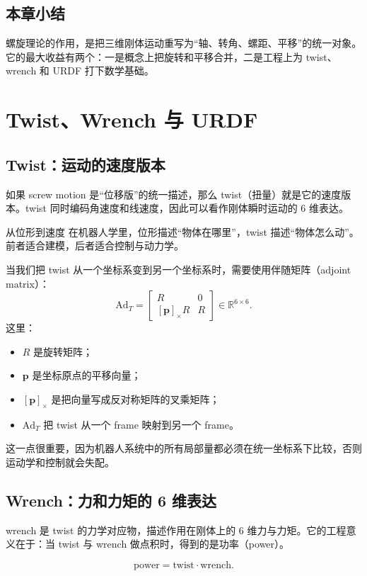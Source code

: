 \documentclass[a4paper]{article}
\begin{document}
\subsection{本章小结}
螺旋理论的作用，是把三维刚体运动重写为“轴、转角、螺距、平移”的统一对象。它的最大收益有两个：一是概念上把旋转和平移合并，二是工程上为 twist、wrench 和 URDF 打下数学基础。

\section{Twist、Wrench 与 URDF}

\subsection{Twist：运动的速度版本}
如果 screw motion 是“位移版”的统一描述，那么 twist（扭量）就是它的速度版本。twist 同时编码角速度和线速度，因此可以看作刚体瞬时运动的 6 维表达。

\begin{importantbox}{从位形到速度}
在机器人学里，位形描述“物体在哪里”，twist 描述“物体怎么动”。前者适合建模，后者适合控制与动力学。
\end{importantbox}

当我们把 twist 从一个坐标系变到另一个坐标系时，需要使用伴随矩阵（adjoint matrix）：
\[
\mathrm{Ad}_T =
\begin{bmatrix}
R & 0 \\
[\mathbf{p}]_\times R & R
\end{bmatrix}
\in \mathbb{R}^{6\times 6}.
\]
这里：
\begin{itemize}
  \item $R$ 是旋转矩阵；
  \item $\mathbf{p}$ 是坐标原点的平移向量；
  \item $[\mathbf{p}]_\times$ 是把向量写成反对称矩阵的叉乘矩阵；
  \item $\mathrm{Ad}_T$ 把 twist 从一个 frame 映射到另一个 frame。
\end{itemize}
这一点很重要，因为机器人系统中的所有局部量都必须在统一坐标系下比较，否则运动学和控制就会失配。

\subsection{Wrench：力和力矩的 6 维表达}
wrench 是 twist 的力学对应物，描述作用在刚体上的 6 维力与力矩。它的工程意义在于：当 twist 与 wrench 做点积时，得到的是功率（power）。

\[
\text{power} = \text{twist} \cdot \text{wrench}.
\]
\end{document}
